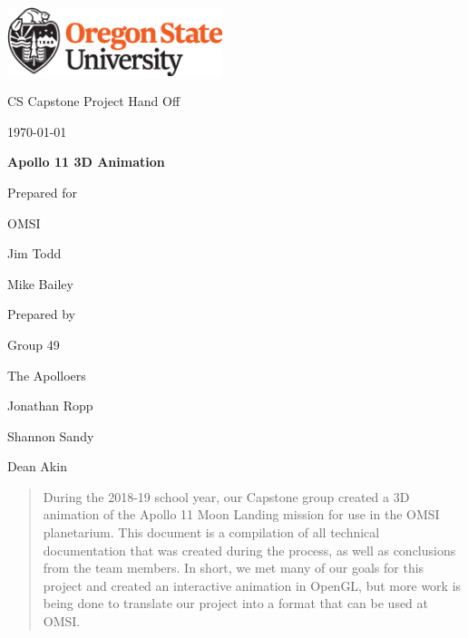 \documentclass[onecolumn, draftclsnofoot,10pt, compsoc]{IEEEtran}
\def \CapstoneTeamName{		    The Apolloers}
\def \CapstoneTeamNumber{		49}
\def \GroupMemberOne{			Jonathan Ropp}
\def \GroupMemberTwo{			Shannon Sandy}
\def \GroupMemberThree{			Dean Akin}
\def \CapstoneProjectName{		Apollo 11 3D Animation}
\def \CapstoneSponsorCompany{	OMSI}
\def \CapstoneSponsorPersona{	Jim Todd}
\def \CapstoneSponsorPersonb{	Mike Bailey}
\def \DocType{		
				Project Hand Off
				}
\newcommand{\NameSigPair}[1]{\par
\makebox[2.75in][r]{#1} \hfil 	\makebox[3.25in]{\makebox[2.25in]{\hrulefill} \hfill		\makebox[.75in]{\hrulefill}}
\par\vspace{-12pt} \textit{\tiny\noindent
\makebox[2.75in]{} \hfil		\makebox[3.25in]{\makebox[2.25in][r]{Signature} \hfill	\makebox[.75in][r]{Date}}}}
\renewcommand{\NameSigPair}[1]{#1}
\begin{document}
\begin{titlepage}
    \begin{singlespace}
        \hfill 
        \includegraphics[height=2cm]{OSU_horizontal_2C_O_over_B.eps}   
        \par\vspace{.2in}
        \centering
        \scshape{
            \huge CS Capstone \DocType \par
            {\large\today}\par
            \vspace{.5in}
            \textbf{\Huge\CapstoneProjectName}\par
            \vfill
            {\large Prepared for}\par
            \Huge \CapstoneSponsorCompany\par
            \vspace{5pt}
            {\Large\NameSigPair{\CapstoneSponsorPersona}\par}
            {\Large\NameSigPair{\CapstoneSponsorPersonb}\par}
            {\large Prepared by }\par
            Group\CapstoneTeamNumber\par
            \CapstoneTeamName\par 
            \vspace{5pt}
            {\Large
                \NameSigPair{\GroupMemberOne}\par
                \NameSigPair{\GroupMemberTwo}\par
                \NameSigPair{\GroupMemberThree}\par
            }
            \vspace{20pt}
        }
        \begin{abstract}
    
During the 2018-19 school year, our Capstone group created a 3D animation of the Apollo 11 Moon Landing mission for use in the OMSI planetarium. This document is a compilation of all technical documentation that was created during the process, as well as conclusions from the team members. In short, we met many of our goals for this project and created an interactive animation in OpenGL, but more work is being done to translate our project into a format that can be used at OMSI. 

        \end{abstract}     
    \end{singlespace}
\end{titlepage}
\newpage
{}
\tableofcontents
\end{document}
